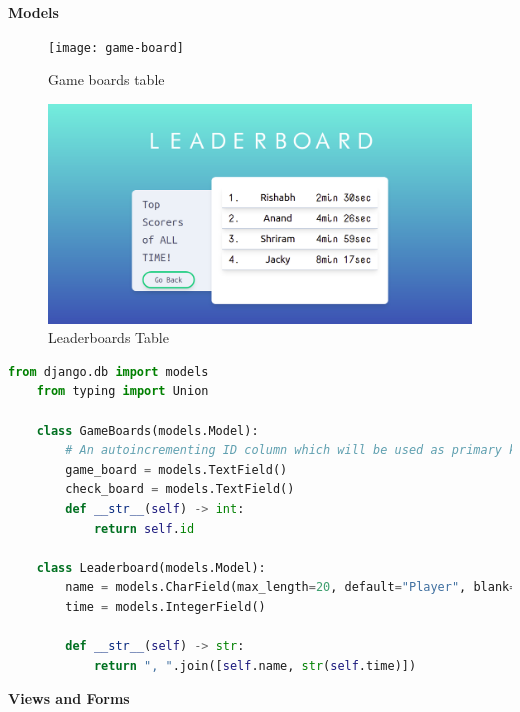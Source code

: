 \documentclass[12pt, a4paper]{report}
\begin{document}
    \textbf{Models}
    \begin{figure}[h!]
        \centering
        \texttt{[image: game-board]}
        \caption{Game boards table}
        \label{fig:game-boards}
    \end{figure}
    \begin{figure}[h!]
        \centering
        \includegraphics{leaderboard}
        \caption{Leaderboards Table}
        \label{fig:leaderboard}
    \end{figure}
    \newpage
    \begin{lstlisting}[language=Python, caption=mainapp/models.py]
    from django.db import models
    from typing import Union

    class GameBoards(models.Model):
        # An autoincrementing ID column which will be used as primary key is automatically added.
        game_board = models.TextField()
        check_board = models.TextField()
        def __str__(self) -> int:
            return self.id
    
    class Leaderboard(models.Model):
        name = models.CharField(max_length=20, default="Player", blank=False)
        time = models.IntegerField()
    
        def __str__(self) -> str: 
            return ", ".join([self.name, str(self.time)])
    \end{lstlisting}
    \textbf{Views and Forms}
\end{document}
